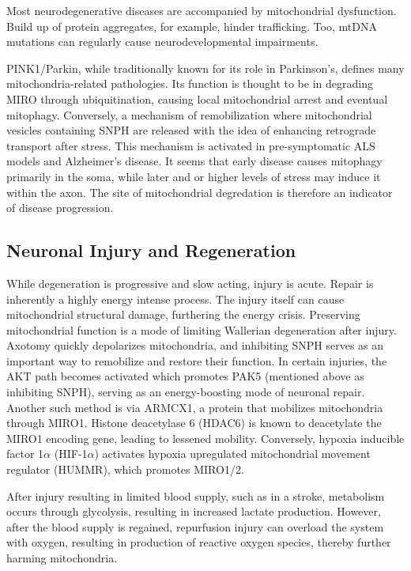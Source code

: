 Most neurodegenerative diseases are accompanied by mitochondrial dysfunction. Build up of protein aggregates, for example, hinder trafficking. Too, mtDNA mutations can regularly cause neurodevelopmental impairments.\newline

PINK1/Parkin, while traditionally known for its role in Parkinson's, defines many mitochondria-related pathologies. Its function is thought to be in degrading MIRO through ubiquitination, causing local mitochondrial arrest and eventual mitophagy. Conversely, a mechanism of remobilization where mitochondrial vesicles containing SNPH are released with the idea of enhancing retrograde transport after stress. This mechanism is activated in pre-symptomatic ALS models and Alzheimer's disease. It seems that early disease causes mitophagy primarily in the soma, while later and or higher levels of stress may induce it within the axon. The site of mitochondrial degredation is therefore an indicator of disease progression. 

\subsection{Neuronal Injury and Regeneration}

While degeneration is progressive and slow acting, injury is acute. Repair is inherently a highly energy intense process. The injury itself can cause mitochondrial structural damage, furthering the energy crisis. Preserving mitochondrial function is a mode of limiting Wallerian degeneration after injury. Axotomy quickly depolarizes mitochondria, and inhibiting SNPH serves as an important way to remobilize and restore their function. In certain injuries, the AKT path becomes activated which promotes PAK5 (mentioned above as inhibiting SNPH), serving as an energy-boosting mode of neuronal repair. Another such method is via ARMCX1, a protein that mobilizes mitochondria through MIRO1. Histone deacetylase 6 (HDAC6) is known to deacetylate the MIRO1 encoding gene, leading to lessened mobility. Conversely, hypoxia inducible factor 1$\alpha$ (HIF-1$\alpha$) activates hypoxia upregulated mitochondrial movement regulator (HUMMR), which promotes MIRO1/2. \newline

After injury resulting in limited blood supply, such as in a stroke, metabolism occurs through glycolysis, resulting in increased lactate production. However, after the blood supply is regained, repurfusion injury can overload the system with oxygen, resulting in production of reactive oxygen species, thereby further harming mitochondria.\newline

